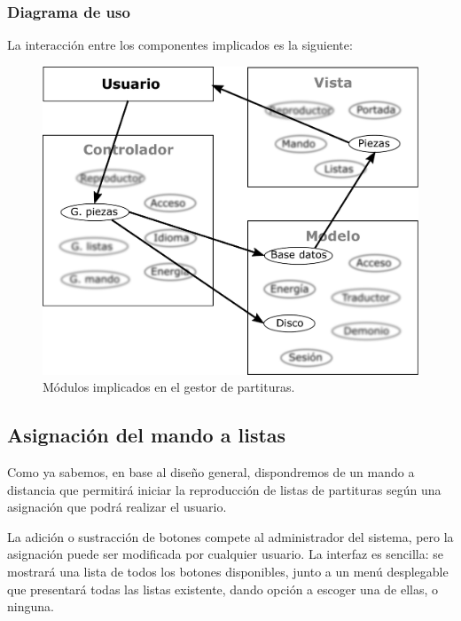 \subsubsection{Diagrama de uso}

La interacción entre los componentes implicados es la siguiente:

\smallskip

\begin{figure}[H]
	\noindent \begin{centering}
		\includegraphics[width=\linewidth/2]{capitulo4/mvc_piezas}
		\par\end{centering}
	\smallskip
	\caption{\label{fig:mvc_piezas} Módulos implicados en el gestor de partituras.}
\end{figure} 

\smallskip

\subsection{Asignación del mando a listas}

Como ya sabemos, en base al diseño general, dispondremos de un mando a distancia que permitirá iniciar la reproducción de listas de partituras según una asignación que podrá realizar el usuario.

La adición o sustracción de botones compete al administrador del sistema, pero la asignación puede ser modificada por cualquier usuario. La interfaz es sencilla: se mostrará una lista de todos los botones disponibles, junto a un menú desplegable que presentará todas las listas existente, dando opción a escoger una de ellas, o ninguna.

